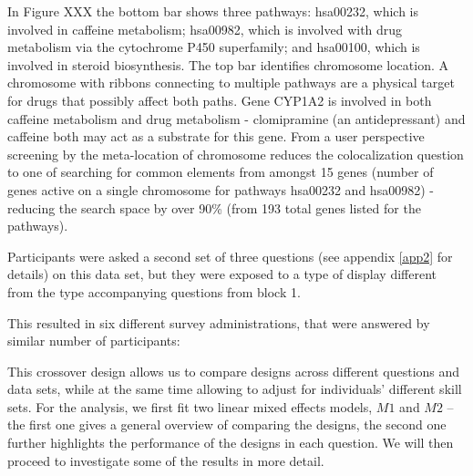In Figure XXX the bottom bar shows three pathways: hsa00232, which is involved in caffeine metabolism; hsa00982, which is involved with drug metabolism via the cytochrome P450 superfamily; and hsa00100, which is involved in steroid biosynthesis. The top bar identifies chromosome location. A chromosome with ribbons connecting to multiple pathways are a physical target for drugs that possibly affect both paths. Gene CYP1A2 is involved in both caffeine metabolism and drug metabolism - clomipramine (an antidepressant) and caffeine both may act as a substrate for this gene. From a user perspective screening by the meta-location of chromosome reduces the colocalization question to one of searching for common elements from amongst 15 genes (number of genes active on a single chromosome for pathways hsa00232 and hsa00982) - reducing the search space by over 90\% (from 193 total genes listed for the pathways).

 
Participants were asked a second set of three questions (see appendix \ref{app2} for details) on this data set, but they were exposed to a  type of display different from the type accompanying questions from block 1.
  
This resulted in six different survey administrations, that were answered by similar number of participants: 

{ 

}


\noindent
This crossover design allows us to compare designs across different questions and data sets, while at the same time allowing to adjust for individuals' different skill sets. 
For the analysis, we first fit two linear mixed effects models, $M1$ and $M2$ -- the first one gives a general overview of comparing the designs, the second one further highlights the performance of the designs in each question.
We will then proceed to investigate some of the results in more detail.





